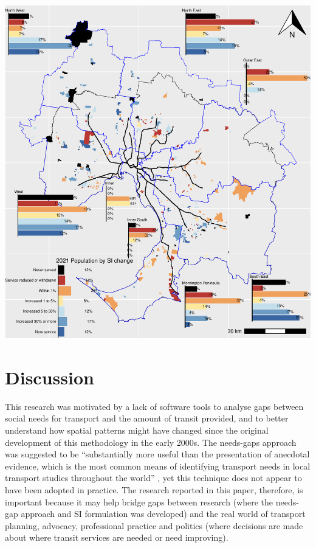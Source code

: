 \documentclass[preprint, 3p,
authoryear]{elsarticle} %
\begin{document}
\includegraphics{ReynoldsCurrieQu2024_files/figure-latex/Greater_Melbourne_2021_needs_gap_SA4_service_change-3.pdf}

\section{Discussion}\label{discussion}

This research was motivated by a lack of software tools to analyse gaps
between social needs for transport and the amount of transit provided,
and to better understand how spatial patterns might have changed since
the original development of this methodology in the early 2000s. The
needs-gaps approach was suggested to be ``substantially more useful than
the presentation of anecdotal evidence, which is the most common means
of identifying transport needs in local transport studies throughout the
world'' \citep{currie2010identifying}, yet this technique does not
appear to have been adopted in practice. The research reported in this
paper, therefore, is important because it may help bridge gaps between
research (where the needs-gap approach and SI formulation was developed)
and the real world of transport planning, advocacy, professional
practice and politics (where decisions are made about where transit
services are needed or need improving).
\end{document}
